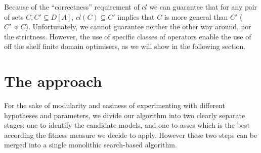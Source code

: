 Because of the ``correctness'' requirement of $cl$ we can guarantee that for any pair of sets $C, C'\subseteq D[A]$, $cl(C)\subseteq C'$ implies that $C$ is more general than $C'$ ($C'\preceq C$). Unfortunately, we cannot guarantee neither the other way around, nor the strictness. However, the use of specific classes of operators enable the use of off the shelf finite domain optimisers, as we will show in the following section. 

\section{The approach}
\label{sec:approach}

For the sake of modularity and easiness of experimenting with different hypotheses and parameters, we divide our algorithm into two clearly separate stages: one to identify the candidate models, and one to asses which is the best according the fitness measure we decide to apply. However these two steps can be merged into a single monolithic search-based algorithm.


